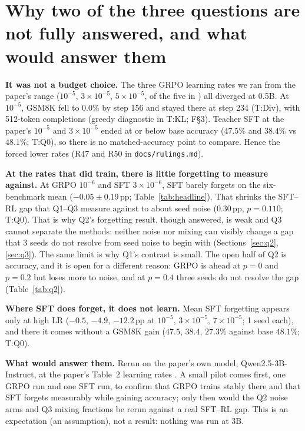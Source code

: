 \documentclass[11pt]{article}
\newcommand{\pp}{\,pp\xspace}
\newcommand{\T}[1]{\textsf{T:#1}}
\newcommand{\F}[1]{\textsf{F\S#1}}
\begin{document}
\section{Why two of the three questions are not fully answered, and what would answer them}
\label{sec:why}
\textbf{It was not a budget choice.} The three GRPO learning rates we ran from the paper's range ($10^{-5}$,
$3\times10^{-5}$, $5\times10^{-5}$, of the five in \cite[Table~2, p.~19]{razor}) all diverged at 0.5B. At $10^{-5}$,
GSM8K fell to $0.0$\% by step 156 and stayed there at step 234 (\T{Div}), with 512-token completions (greedy
diagnostic in \T{KL}; \F{3}). Teacher SFT at the paper's $10^{-5}$ and $3\times10^{-5}$ ended at or below base accuracy
($47.5$\% and $38.4$\% vs $48.1$\%; \T{Q0}), so there is no matched-accuracy point to compare. Hence the forced lower
rates (R47 and R50 in \texttt{docs/rulings.md}).

\textbf{At the rates that did train, there is little forgetting to measure against.} At GRPO $10^{-6}$ and SFT
$3\times10^{-6}$, SFT barely forgets on the six-benchmark mean ($-0.05 \pm 0.19$\pp; Table~\ref{tab:headline}). That
shrinks the SFT--RL gap that Q1--Q3 measure against to about seed noise ($0.30$\pp, $p = 0.110$; \T{Q0}). That is why
Q2's forgetting result, though answered, is weak and Q3 cannot separate the methods: neither noise nor mixing can
visibly change a gap that 3 seeds do not resolve from seed noise to begin with (Sections~\ref{sec:q2}, \ref{sec:q3}). The same limit is
why Q1's contrast is small. The open half of Q2 is accuracy, and it is open for a different reason: GRPO is ahead at
$p = 0$ and $p = 0.2$ but loses more to noise, and at $p = 0.4$ three seeds do not resolve the gap
(Table~\ref{tab:q2}).

\textbf{Where SFT does forget, it does not learn.} Mean SFT forgetting appears only at high LR ($-0.5$, $-4.9$,
$-12.2$\pp at $10^{-5}$, $3\times10^{-5}$, $7\times10^{-5}$; 1 seed each), and there it comes without a GSM8K gain
($47.5$, $38.4$, $27.3$\% against base $48.1$\%; \T{Q0}).

\textbf{What would answer them.} Rerun on the paper's own model, Qwen2.5-3B-Instruct, at the paper's Table~2 learning
rates \cite[\S3.1, p.~4; Table~2, p.~19]{razor}. A small pilot comes first, one GRPO run and one SFT run, to confirm
that GRPO trains stably there and that SFT forgets measurably while gaining accuracy; only then would the Q2 noise
arms and Q3 mixing fractions be rerun against a real SFT--RL gap. This is an expectation (an assumption), not a
result: nothing was run at 3B.
\end{document}
